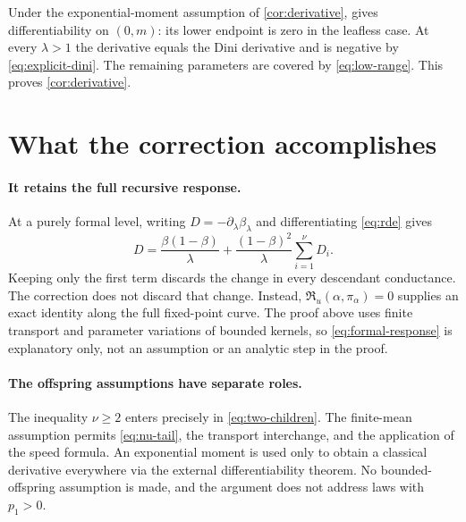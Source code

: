 \documentclass[11pt,a4paper]{article}
\numberwithin{equation}{section}
\theoremstyle{notethm}
\theoremstyle{definition}
\newcommand{\res}{\mathfrak R}
\begin{document}
Under the exponential-moment assumption of \cref{cor:derivative},
\cite[Theorem~1.1]{BT} gives differentiability on $(0,m)$: its lower endpoint
is zero in the leafless case. At every $\lambda>1$ the derivative equals the
Dini derivative and is negative by \eqref{eq:explicit-dini}. The remaining
parameters are covered by \eqref{eq:low-range}. This proves
\cref{cor:derivative}.

\section{What the correction accomplishes}\label{sec:meaning}

\paragraph{It retains the full recursive response.}
At a purely formal level, writing $D=-\partial_\lambda\beta_\lambda$ and
differentiating \eqref{eq:rde} gives
\begin{equation}\label{eq:formal-response}
 D=\frac{\beta(1-\beta)}{\lambda}
    +\frac{(1-\beta)^2}{\lambda}\sum_{i=1}^{\nu}D_i.
\end{equation}
Keeping only the first term discards the change in every descendant
conductance. The correction does not discard that change. Instead,
$\res_u(\alpha,\pi_\alpha)=0$ supplies an exact identity along the full
fixed-point curve. The proof above uses finite transport and parameter
variations of bounded kernels, so \eqref{eq:formal-response} is explanatory
only, not an assumption or an analytic step in the proof.

\paragraph{The offspring assumptions have separate roles.}
The inequality $\nu\ge2$ enters precisely in \eqref{eq:two-children}.
The finite-mean assumption permits \eqref{eq:nu-tail}, the transport
interchange, and the application of the speed formula. An exponential
moment is used only to obtain a classical derivative everywhere via the
external differentiability theorem. No bounded-offspring assumption is
made, and the argument does not address laws with $p_1>0$.
\end{document}
